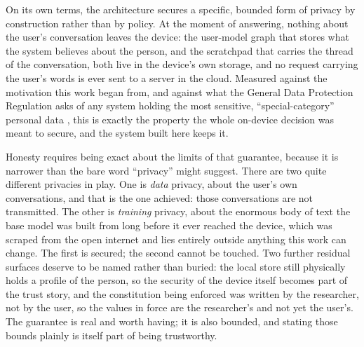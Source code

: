 On its own terms, the architecture secures a specific, bounded form of privacy by construction rather than by policy. At the moment of answering, nothing about the user's conversation leaves the device: the user-model graph that stores what the system believes about the person, and the scratchpad that carries the thread of the conversation, both live in the device's own storage, and no request carrying the user's words is ever sent to a server in the cloud. Measured against the motivation this work began from, and against what the General Data Protection Regulation asks of any system holding the most sensitive, ``special-category'' personal data \cite{gdpr2016}, this is exactly the property the whole on-device decision was meant to secure, and the system built here keeps it.

Honesty requires being exact about the limits of that guarantee, because it is narrower than the bare word ``privacy'' might suggest. There are two quite different privacies in play. One is \emph{data} privacy, about the user's own conversations, and that is the one achieved: those conversations are not transmitted. The other is \emph{training} privacy, about the enormous body of text the base model was built from long before it ever reached the device, which was scraped from the open internet and lies entirely outside anything this work can change. The first is secured; the second cannot be touched. Two further residual surfaces deserve to be named rather than buried: the local store still physically holds a profile of the person, so the security of the device itself becomes part of the trust story, and the constitution being enforced was written by the researcher, not by the user, so the values in force are the researcher's and not yet the user's. The guarantee is real and worth having; it is also bounded, and stating those bounds plainly is itself part of being trustworthy.


